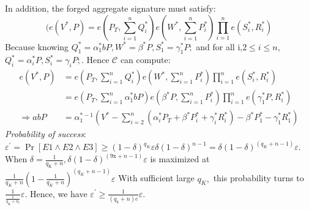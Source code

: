 \documentclass[11pt]{article}
\begin{document}
In addition, the forged aggregate signature must satisfy:
\begin{equation}
      (e\left(V^{*}, P\right)=e\left(P_{T}, \sum_{i=1}^{n} Q_{i}^{*}\right) e\left(W^{*}, \sum_{i=1}^{n} P_{i}^{*}\right) \prod_{i=1}^{n} e\left(S_{i}^{*}, R_{i}^{*}\right)
\end{equation}
Because knowing $Q_{1}^{*}=\alpha_{1}^{*} b P, W^{*}= \beta^{*}P, S_{1}^{*}=\gamma_{1}^{*} P;$ and for all i,$2 \le i \le n$, $Q_{i}^{*}=\alpha_{i}^{*} P, S_{i}^{*}=\gamma_{i}P;$. Hence \(\mathcal{C}\) can compute:
\begin{align}
      e\left(V^{*}, P\right)&=e\left(P_{T}, \sum_{i=1}^{n} Q_{i}^{*}\right) e\left(W^{*}, \sum_{i=1}^{n} P_{i}^{*}\right) \prod_{i=1}^{n} e\left(S_{i}^{*}, R_{i}^{*}\right)\\
      &= e\left(P_{T}, \sum_{i=1}^{n} \alpha_{1}^{*}bP\right) e\left(\beta^{*}P, \sum_{i=1}^{n} P_{i}^{*}\right) \prod_{i=1}^{n} e\left(\gamma_{1}^{*}P, R_{i}^{*}\right)\\
      \Rightarrow a b P&=\alpha_{1}^{*-1}\left(V^{*}-\sum_{i=2}^{n}\left(\alpha_{i}^{*} P_{T}+\beta^{*} P_{i}^{*}+\gamma_{i}^{*} R_{i}^{*}\right)-\beta^{*} P_{1}^{*}-\gamma_{1}^{*} R_{1}^{*}\right)
\end{align}
\textit{Probability of success}: $\varepsilon^{\prime}=\operatorname{Pr}[E 1 \wedge E 2 \wedge E 3] \ge(1-\delta)^{q_{K}} \varepsilon \delta(1-\delta)^{n-1}=\delta(1-\delta)^{\left(q_{K}+n-1\right)} \varepsilon$. When $\delta=\frac{1}{q_{\mathrm{K}}+n}, \delta(1-\delta)^{(9 \mathrm{x}+n-1)} \varepsilon$ is maximized at $\frac{1}{q_{K}+n}\left(1-\frac{1}{q_{K}+n}\right)^{\left(q_{K}+n-1\right)} \varepsilon$
With sufficient large $q_{K},$ this probability turns to $\frac{1}{\frac{1}{q_{\mathrm{K}}+n_{\mathrm{l}}}} \varepsilon$. Hence, we have $\varepsilon^{\prime} \ge \frac{1}{\left(q_{\mathrm{x}}+n\right) e} \varepsilon$.
\end{document}
